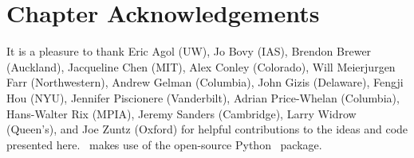 \section{Chapter Acknowledgements}

It is a pleasure to thank
Eric Agol (UW),
Jo Bovy (IAS),
Brendon Brewer (Auckland),
Jacqueline Chen (MIT),
Alex Conley (Colorado),
Will Meierjurgen Farr (Northwestern),
Andrew Gelman (Columbia),
John Gizis (Delaware),
Fengji Hou (NYU),
Jennifer Piscionere (Vanderbilt),
Adrian Price-Whelan (Columbia),
Hans-Walter Rix (MPIA),
Jeremy Sanders (Cambridge),
Larry Widrow (Queen's), and
Joe Zuntz (Oxford)
for helpful contributions to the ideas and code presented here.
\this\ makes use of the open-source Python \numpy\ package.
